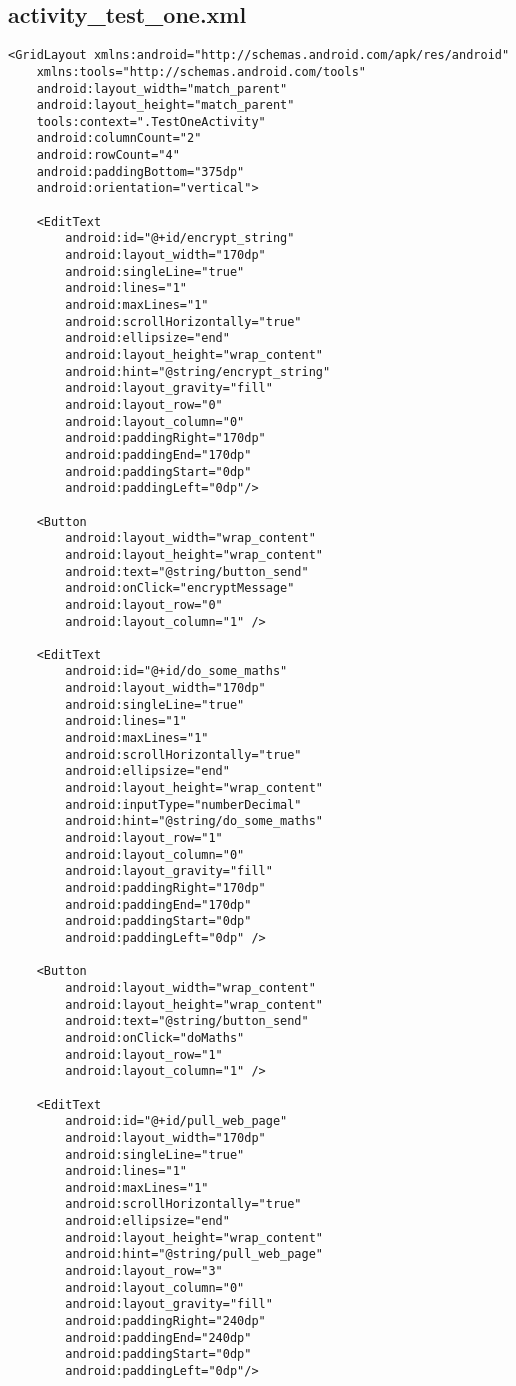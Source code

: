 \subsection{activity\_test\_one.xml}
\label{app:camainxml}
\begin{lstlisting}
<GridLayout xmlns:android="http://schemas.android.com/apk/res/android"
    xmlns:tools="http://schemas.android.com/tools"
    android:layout_width="match_parent"
    android:layout_height="match_parent"
    tools:context=".TestOneActivity"
    android:columnCount="2"
    android:rowCount="4"
    android:paddingBottom="375dp"
    android:orientation="vertical">

    <EditText
        android:id="@+id/encrypt_string"
        android:layout_width="170dp"
        android:singleLine="true"
        android:lines="1"
        android:maxLines="1"
        android:scrollHorizontally="true"
        android:ellipsize="end"
        android:layout_height="wrap_content"
        android:hint="@string/encrypt_string"
        android:layout_gravity="fill"
        android:layout_row="0"
        android:layout_column="0"
        android:paddingRight="170dp"
        android:paddingEnd="170dp"
        android:paddingStart="0dp"
        android:paddingLeft="0dp"/>

    <Button
        android:layout_width="wrap_content"
        android:layout_height="wrap_content"
        android:text="@string/button_send"
        android:onClick="encryptMessage"
        android:layout_row="0"
        android:layout_column="1" />

    <EditText
        android:id="@+id/do_some_maths"
        android:layout_width="170dp"
        android:singleLine="true"
        android:lines="1"
        android:maxLines="1"
        android:scrollHorizontally="true"
        android:ellipsize="end"
        android:layout_height="wrap_content"
        android:inputType="numberDecimal"
        android:hint="@string/do_some_maths"
        android:layout_row="1"
        android:layout_column="0"
        android:layout_gravity="fill"
        android:paddingRight="170dp"
        android:paddingEnd="170dp"
        android:paddingStart="0dp"
        android:paddingLeft="0dp" />

    <Button
        android:layout_width="wrap_content"
        android:layout_height="wrap_content"
        android:text="@string/button_send"
        android:onClick="doMaths"
        android:layout_row="1"
        android:layout_column="1" />

    <EditText
        android:id="@+id/pull_web_page"
        android:layout_width="170dp"
        android:singleLine="true"
        android:lines="1"
        android:maxLines="1"
        android:scrollHorizontally="true"
        android:ellipsize="end"
        android:layout_height="wrap_content"
        android:hint="@string/pull_web_page"
        android:layout_row="3"
        android:layout_column="0"
        android:layout_gravity="fill"
        android:paddingRight="240dp"
        android:paddingEnd="240dp"
        android:paddingStart="0dp"
        android:paddingLeft="0dp"/>


\end{lstlisting}

